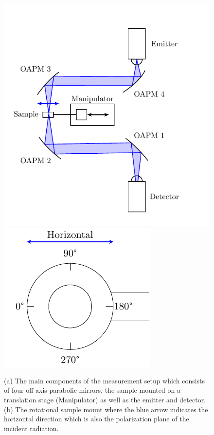 
\begin{figure}[H]
    \centering
    \subcaptionbox{\label{fig:1}}
        {\hspace*{-2em}\includegraphics[width=0.4\linewidth]{images/setup/Setup-THz-TDS-HHI.pdf}}
    \qquad
    \subcaptionbox{\label{fig:2}}
        {\hspace*{-2em}\includegraphics[width=0.4\linewidth]{images/setup/sample_mount_simple_nosample.pdf}}
    
    \caption{(a) The main components of the measurement setup which consists of four off-axis parabolic mirrors, the sample mounted on a translation stage (Manipulator) as well as the emitter and detector. (b) The rotational sample mount where the blue arrow indicates the horizontal direction which is also the polarization plane of the incident radiation.}
    \label{fig:3_THz-TDS-HHI}
\end{figure}

